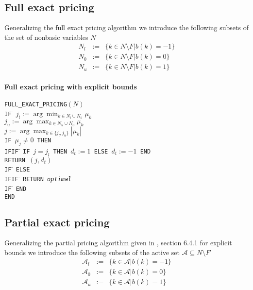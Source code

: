 \documentclass[a4paper]{article}
\begin{document}
\subsection{Full exact pricing}
Generalizing the full exact pricing algorithm we introduce the following subsets of the set of nonbasic variables $N$
\begin{eqnarray}
N_{l}&:=&\{k \in N \setminus F\left|\right. b\left(k\right)=-1\} \\
N_{0}&:=&\{k \in N \setminus F\left|\right. b\left(k\right)=0\} \\
N_{u}&:=&\{k \in N \setminus F\left|\right. b\left(k\right)=1\}
\end{eqnarray}
\paragraph{Full exact pricing with explicit bounds}
\begin{tabbing}
\texttt{FULL\_EXACT\_PRICING$(N)$} \\
\texttt{IF} \= \kill
\> \texttt{$j_{l}:=\arg\min_{k \in N_{l} \cup
                               N_{0}}\mu_{k}$}  \\
\> \texttt{$j_{u}:=\arg\max_{k \in N_{u} \cup
                               N_{0}}\mu_{k}$}  \\
\> \texttt{$j:=\arg\max_{k \in \{j_{l}, j_{u}\}}\left|\mu_{k}\right|$}  \\
\> \texttt{IF $\mu_{j} \neq 0$ THEN} \\
\texttt{IFIF} \= \kill
\> \texttt{IF $j = j_{l}$ THEN $d_{t}:=1$ ELSE $d_{t}:=-1$ END} \\
\> \texttt{RETURN $(j, d_{t})$} \\
\texttt{IF} \= \kill
\> \texttt{ELSE} \\
\texttt{IFIF} \= \kill
\> \texttt{RETURN \emph{optimal}} \\
\texttt{IF} \= \kill
\> \texttt{END} \\
\texttt{END}
\end{tabbing}


\subsection{Partial exact pricing}
Generalizing the partial pricing algorithm given in \cite{Sven}, section 6.4.1 for explicit bounds we introduce the following subsets of the active set $\mathcal{A} \subseteq N \setminus F$ 
\begin{eqnarray}
\mathcal{A}_{l}&:=&\{k \in \mathcal{A}\left|\right. b\left(k\right)=-1\} \\
\mathcal{A}_{0}&:=&\{k \in \mathcal{A}\left|\right. b\left(k\right)=0\} \\
\mathcal{A}_{u}&:=&\{k \in \mathcal{A}\left|\right. b\left(k\right)=1\}
\end{eqnarray}
\end{document}
